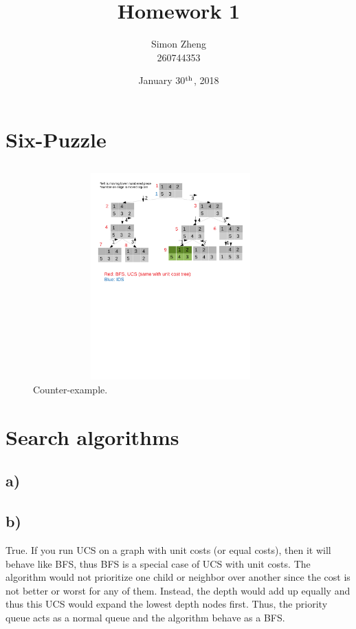 \documentclass[11pt,letterpaper]{article}
\author{Simon Zheng\\260744353}
\title{Homework 1}
\date{January 30$^{\textnormal{th}}$, 2018}
\begin{document}
	\maketitle
	\thispagestyle{fancy}
	
	\section{Six-Puzzle}
		\subsection{}
		\begin{figure}[ht]
			\centering
			\includegraphics[height=300px,width=400px,trim={0 360px 0 0},clip]{q1.pdf}
			\linespread{0.8}\caption{Counter-example.}
		\end{figure}
		
	\section{Search algorithms}
	    \subsection{a)}
	    
	    \subsection{b)}
	    True.
	    If you run UCS on a graph with unit costs (or equal costs), then it will behave like BFS, thus BFS is a special case of UCS with unit costs.
	    The algorithm would not prioritize one child or neighbor over another since the cost is not better or worst for any of them.
	    Instead, the depth would add up equally and thus this UCS would expand the lowest depth nodes first.
	    Thus, the priority queue acts as a normal queue and the algorithm behave as a BFS.
	    
\end{document}
